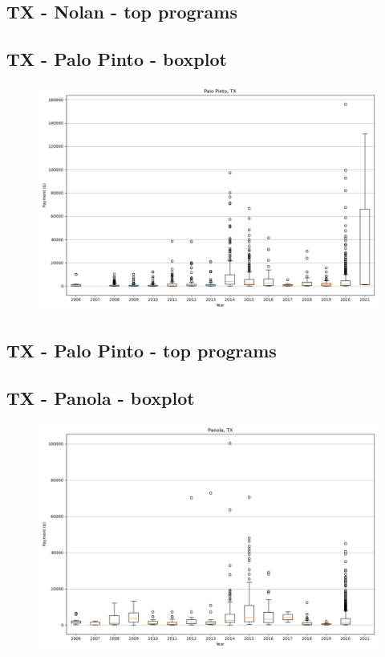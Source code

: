 \subsection*{TX - Nolan - top programs}

\newpage
\subsection*{TX - Palo Pinto - boxplot}
\begin{figure}[h]
\centering
\includegraphics[width=7in]{../output/boxplots/counties/Palo Pinto-TX_boxplot.png}
\end{figure}


\subsection*{TX - Palo Pinto - top programs}

\newpage
\subsection*{TX - Panola - boxplot}
\begin{figure}[h]
\centering
\includegraphics[width=7in]{../output/boxplots/counties/Panola-TX_boxplot.png}
\end{figure}


